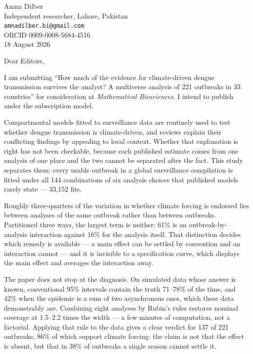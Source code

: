 \documentclass[11pt]{article}
\begin{document}
\begin{flushright}
Amna Dilber\\
Independent researcher, Lahore, Pakistan\\
\texttt{amnadilber.bi@gmail.com}\\
ORCID 0009-0008-5684-4516\\[0.4em]
18 August 2026
\end{flushright}

Dear Editors,

I am submitting ``How much of the evidence for climate-driven dengue
transmission survives the analyst? A multiverse analysis of 221 outbreaks in 33
countries'' for consideration at \emph{Mathematical Biosciences}. I intend to
publish under the subscription model.

Compartmental models fitted to surveillance data are routinely used to test
whether dengue transmission is climate-driven, and reviews explain their
conflicting findings by appealing to local context. Whether that explanation is
right has not been checkable, because each published estimate comes from one
analysis of one place and the two cannot be separated after the fact. This
study separates them: every usable outbreak in a global surveillance
compilation is fitted under all 144 combinations of six analysis choices that
published models rarely state --- 33{,}152 fits.

Roughly three-quarters of the variation in whether climate forcing is endorsed
lies between analyses of the same outbreak rather than between outbreaks.
Partitioned three ways, the largest term is neither: 61\% is an
outbreak-by-analysis interaction against 16\% for the analysis itself. That
distinction decides which remedy is available --- a main effect can be settled
by convention and an interaction cannot --- and it is invisible to a
specification curve, which displays the main effect and averages the
interaction away.

The paper does not stop at the diagnosis. On simulated data whose answer is
known, conventional 95\% intervals contain the truth 71--78\% of the time, and
42\% when the epidemic is a sum of two asynchronous ones, which these data
demonstrably are. Combining eight analyses by Rubin's rules restores nominal
coverage at 1.5--2.2 times the width --- a few minutes of computation, not a
factorial. Applying that rule to the data gives a clear verdict for 137 of 221
outbreaks, 86\% of which support climate forcing: the claim is not that the
effect is absent, but that in 38\% of outbreaks a single season cannot settle
it.
\end{document}
